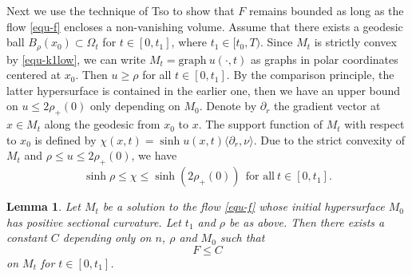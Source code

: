 \documentclass[11pt,reqno]{amsart}
\newtheorem{lemma}[proposition]{Lemma}
\theoremstyle{remark}
\numberwithin{equation}{section}
\begin{document}
Next we use the technique of Tso \cite{Tso85} to show that $F$ remains bounded as long as the flow \eqref{equ-f} encloses a non-vanishing volume. Assume that there exists a geodesic ball $B_{\rho}(x_0)\subset\Omega_t$ for $t\in[0,t_1]$, where $t_1\in [t_0,T)$. Since $M_t$ is strictly convex by \eqref{equ-k1low}, we can write $M_t=\mathrm{graph}~u(\cdot,t)$ as graphs in polar coordinates centered at $x_0$. Then $u\geq \rho$ for all $t\in [0,t_1]$. By the comparison principle, the latter hypersurface is contained in the earlier one, then we have an upper bound on $u\leq 2\rho_+(0)$ only depending on $M_0$. Denote by $\partial_r$ the gradient vector at $x\in M_t$ along the geodesic from $x_0$ to $x$. The support function of $M_t$ with respect to $x_0$ is defined by $\chi(x,t)= \sinh u(x,t)\langle \partial_r,\nu \rangle$. Due to the strict convexity of $M_t$ and $\rho\leq u \leq 2\rho_+(0)$, we have 
\begin{equation}
	\sinh\rho \leq \chi \leq\sinh(2\rho_+(0))\ \ \mbox{for\ all}\ t\in [0,t_1].
	\label{equ-supplbd}
\end{equation}
\begin{lemma}\label{s4.lem-F}
	Let $M_t$ be a solution to the flow \eqref{equ-f} whose initial hypersurface $M_0$ has positive sectional curvature. Let $t_1$ and $\rho$ be as above. Then there exists a constant $C$ depending only on $n$, $\rho$ and $M_0$ such that
	\begin{equation}
		F \leq C
		\label{equ-psiupp}
	\end{equation}
    on $M_t$ for $t\in [0,t_1]$. 
\end{lemma}
\end{document}
